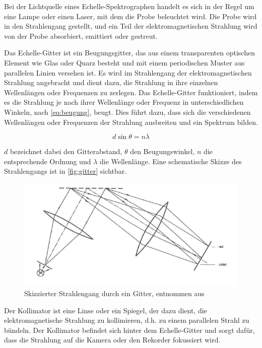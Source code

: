 \documentclass[12pt,english,ngerman]{scrartcl}
\begin{document}
Bei der Lichtquelle eines Echelle-Spektrographen handelt es sich in der Regel
um eine Lampe oder einen Laser, mit dem die Probe beleuchtet wird. Die Probe
wird in den Strahlengang gestellt, und ein Teil der elektromagnetischen
Strahlung wird von der Probe absorbiert, emittiert oder gestreut.

Das Echelle-Gitter ist ein Beugungsgitter, das aus einem transparenten
optischen Element wie Glas oder Quarz besteht und mit einem periodischen Muster
aus parallelen Linien versehen ist. Es wird im Strahlengang der
elektromagnetischen Strahlung angebracht und dient dazu, die Strahlung in ihre
einzelnen Wellenlängen oder Frequenzen zu zerlegen. Das Echelle-Gitter
funktioniert, indem es die Strahlung je nach ihrer Wellenlänge oder Frequenz in
unterschiedlichen Winkeln, nach \autoref{eq:beugung}, beugt. Dies führt dazu,
dass sich die verschiedenen Wellenlängen oder Frequenzen der Strahlung
ausbreiten und ein Spektrum bilden.

\begin{equation}
	d \sin{\theta} = n \lambda
	\label{eq:beugung}
\end{equation}

$d$ bezeichnet dabei den Gitterabstand, $\theta$ den Beugungswinkel, $n$ die entsprechende Ordnung und $\lambda$ die Wellenlänge.
Eine schematische Skizze des Strahlengangs ist in \autoref{fig:gitter} sichtbar.

\begin{figure}[H]
	\begin{center}
		\includegraphics[width =\textwidth]{./figures/skizze_gitter.png}
	\end{center}
	\caption[Skizzierter Strahlengang durch ein Gitter] {Skizzierter Strahlengang durch ein
		Gitter, entnommen aus~\cite{noauthor_spectrograph_2016}
	}\label{fig:gitter}
\end{figure}

Der Kollimator ist eine Linse oder ein Spiegel, der dazu dient, die
elektromagnetische Strahlung zu kollimieren, d.h. zu einem parallelen Strahl zu
bündeln. Der Kollimator befindet sich hinter dem Echelle-Gitter und sorgt
dafür, dass die Strahlung auf die Kamera oder den Rekorder fokussiert wird.
\end{document}
